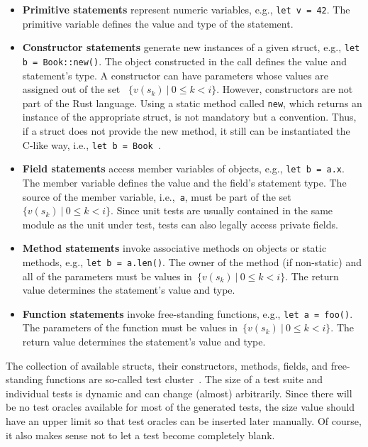 \documentclass[paper=a4,%
  twoside,%
  BCOR4mm,%
  abstract=true,%
  toc=bibliography,%
  chapterprefix=true,%
  toc=bibliographynumbered,%
  open=right,%
  english,%
  pagesize=pdftex]{scrreprt}
\begin{document}
\begin{itemize}
    \item \textbf{Primitive statements} represent numeric variables, e.g., \texttt{let v = 42}. The primitive variable defines the value and type of the statement.
    \item \textbf{Constructor statements} generate new instances of a given struct, e.g., \texttt{let b = Book::new()}. The object constructed in the call defines the value and statement's type. A constructor can have parameters whose values are assigned out of the set ~$\{v(s_k)~|~0 \leq k < i\}$. However, constructors are not part of the Rust language. Using a static method called \texttt{new}, which returns an instance of the appropriate struct, is not mandatory but a convention. Thus, if a struct does not provide the new method, it still can be instantiated the C-like way, i.e., \texttt{let b = Book }.
    \item \textbf{Field statements} access member variables of objects, e.g., \texttt{let b = a.x}. The member variable defines the value and the field's statement type. The source of the member variable, i.e.,~\texttt{a}, must be part of the set~$\{v(s_k)~|~0 \leq k < i\}$. Since unit tests are usually contained in the same module as the unit under test, tests can also legally access private fields.
    \item \textbf{Method statements} invoke associative methods on objects or static methods, e.g., \texttt{let b = a.len()}. The owner of the method (if non-static) and all of the parameters must be values in~${\{v(s_k)~|~0 \leq k < i\}}$. The return value determines the statement's value and type.
    \item \textbf{Function statements} invoke free-standing functions, e.g., \texttt{let a = foo()}. The parameters of the function must be values in~$\{v(s_k)~|~0 \leq k < i\}$. The return value determines the statement's value and type.
\end{itemize}

The collection of available structs, their constructors, methods, fields, and free-standing functions are so-called test cluster~\cite{Fraser_2011a}. The size of a test suite and individual tests is dynamic and can change (almost) arbitrarily. Since there will be no test oracles available for most of the generated tests, the size value should have an upper limit so that test oracles can be inserted later manually. Of course, it also makes sense not to let a test become completely blank.
\end{document}
